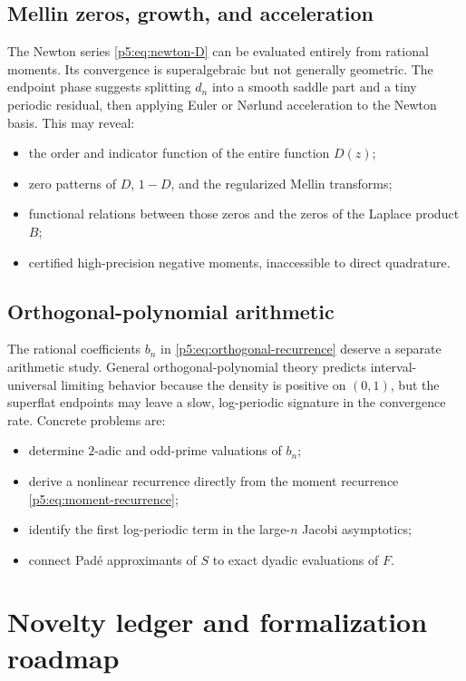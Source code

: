 \documentclass[11pt,oneside]{article}
\theoremstyle{definition}
\theoremstyle{remark}
\newcommand{\1}{\mathbf 1}
\begin{document}
\subsection{Mellin zeros, growth, and acceleration}

The Newton series \eqref{p5:eq:newton-D} can be evaluated entirely from rational moments.  Its convergence is superalgebraic but not generally geometric.  The endpoint phase suggests splitting $d_n$ into a smooth saddle part and a tiny periodic residual, then applying Euler or N\o rlund acceleration to the Newton basis.  This may reveal:
\begin{itemize}
\item the order and indicator function of the entire function $D(z)$;
\item zero patterns of $D$, $1-D$, and the regularized Mellin transforms;
\item functional relations between those zeros and the zeros of the Laplace product $B$;
\item certified high-precision negative moments, inaccessible to direct quadrature.
\end{itemize}

\subsection{Orthogonal-polynomial arithmetic}

The rational coefficients $b_n$ in \eqref{p5:eq:orthogonal-recurrence} deserve a separate arithmetic study.  General orthogonal-polynomial theory predicts interval-universal limiting behavior because the density is positive on $(0,1)$, but the superflat endpoints may leave a slow, log-periodic signature in the convergence rate.  Concrete problems are:
\begin{itemize}
\item determine $2$-adic and odd-prime valuations of $b_n$;
\item derive a nonlinear recurrence directly from the moment recurrence \eqref{p5:eq:moment-recurrence};
\item identify the first log-periodic term in the large-$n$ Jacobi asymptotics;
\item connect Pad\'e approximants of $S$ to exact dyadic evaluations of $F$.
\end{itemize}

\section{Novelty ledger and formalization roadmap}
\end{document}
